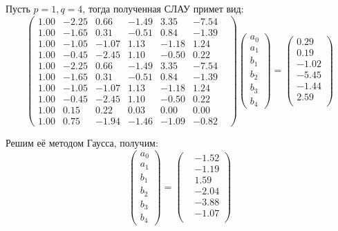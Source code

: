 \documentclass[a4paper, fontsize=14pt]{article}
\begin{document}
Пусть $p = 1, q = 4$, тогда полученная СЛАУ примет вид:
\begin{equation*}
    \begin{pmatrix}
        1.00&  -2.25&   0.66&  -1.49&   3.35&  -7.54& \\
        1.00&  -1.65&   0.31&  -0.51&   0.84&  -1.39& \\
        1.00&  -1.05&  -1.07&   1.13&  -1.18&   1.24& \\
        1.00&  -0.45&  -2.45&   1.10&  -0.50&   0.22& \\
        1.00&  -2.25&   0.66&  -1.49&   3.35&  -7.54& \\ 
        1.00&  -1.65&   0.31&  -0.51&   0.84&  -1.39& \\           
        1.00&  -1.05&  -1.07&   1.13&  -1.18&   1.24& \\           
        1.00&  -0.45&  -2.45&   1.10&  -0.50&   0.22& \\                    
        1.00&   0.15&   0.22&   0.03&   0.00&   0.00& \\                                   
        1.00&   0.75&  -1.94&  -1.46&  -1.09&  -0.82&
    \end{pmatrix}
    \begin{pmatrix}
        a_0 \\
        a_1 \\
        b_1 \\
        b_2 \\
        b_3 \\
        b_4 
    \end{pmatrix}   
    =
    \begin{pmatrix}
        0.29\\  0.19\\ -1.02\\ -5.45\\ -1.44\\  2.59\\
    \end{pmatrix}      
\end{equation*}

Решим её методом Гаусса, получим:
\begin{equation*}
    \begin{pmatrix}
        a_0 \\
        a_1 \\
        b_1 \\
        b_2 \\
        b_3 \\
        b_4 
    \end{pmatrix} =
    \begin{pmatrix}
        &-1.52\\ &-1.19\\  &1.59\\ &-2.04\\ &-3.88\\ &-1.07\\
    \end{pmatrix} 
\end{equation*}
\end{document}
